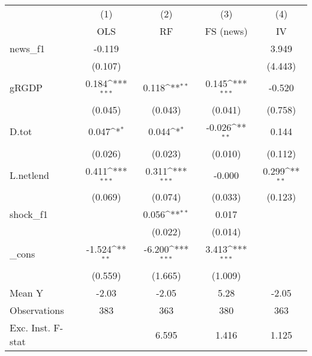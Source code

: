 {
\def\sym#1{\ifmmode^{#1}\else\(^{#1}\)\fi}
\begin{tabular}{l*{4}{c}}
\toprule
            &\multicolumn{1}{c}{(1)}&\multicolumn{1}{c}{(2)}&\multicolumn{1}{c}{(3)}&\multicolumn{1}{c}{(4)}\\
            &\multicolumn{1}{c}{OLS}&\multicolumn{1}{c}{RF}&\multicolumn{1}{c}{FS (news)}&\multicolumn{1}{c}{IV}\\
\midrule
news\_f1     &      -0.119         &                     &                     &       3.949         \\
            &     (0.107)         &                     &                     &     (4.443)         \\
\addlinespace
gRGDP       &       0.184\sym{***}&       0.118\sym{**} &       0.145\sym{***}&      -0.520         \\
            &     (0.045)         &     (0.043)         &     (0.041)         &     (0.758)         \\
\addlinespace
D.tot       &       0.047\sym{*}  &       0.044\sym{*}  &      -0.026\sym{**} &       0.144         \\
            &     (0.026)         &     (0.023)         &     (0.010)         &     (0.112)         \\
\addlinespace
L.netlend   &       0.411\sym{***}&       0.311\sym{***}&      -0.000         &       0.299\sym{**} \\
            &     (0.069)         &     (0.074)         &     (0.033)         &     (0.123)         \\
\addlinespace
shock\_f1    &                     &       0.056\sym{**} &       0.017         &                     \\
            &                     &     (0.022)         &     (0.014)         &                     \\
\addlinespace
\_cons      &      -1.524\sym{**} &      -6.200\sym{***}&       3.413\sym{***}&                     \\
            &     (0.559)         &     (1.665)         &     (1.009)         &                     \\
\midrule
Mean Y      &       -2.03         &       -2.05         &        5.28         &       -2.05         \\
Observations&         383         &         363         &         380         &         363         \\
Exc. Inst. F-stat&                     &       6.595         &       1.416         &       1.125         \\
\bottomrule
\end{tabular}
}
